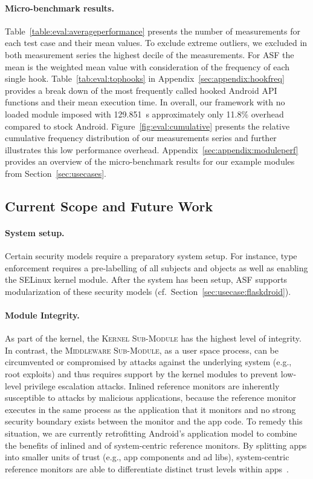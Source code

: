 \documentclass[letterpaper,twocolumn,10pt]{article}
\newcommand{\OURSHORT}{\textsc{ASF}\xspace}
\newcommand{\KMODULE}{\textsc{Kernel Sub-Module}\xspace}
\newcommand{\MMODULE}{\textsc{Middleware Sub-Module}\xspace}
\begin{document}
\paragraph{Micro-benchmark results.}
Table~\ref{table:eval:averageperformance} presents the number of measurements for each test case and their mean values. To exclude extreme outliers, we excluded in both measurement series the highest decile of the measurements. For \OURSHORT the mean is the weighted mean value with consideration of the frequency of each single hook. Table~\ref{tab:eval:tophooks} in Appendix~\ref{sec:appendix:hookfreq} provides a break down of the most frequently called hooked Android API functions and their mean execution time. In overall, our framework with no loaded module imposed with 129.851~s approximately only 11.8\% overhead compared to stock Android. Figure~\ref{fig:eval:cumulative} presents the relative cumulative frequency distribution of our measurements series and further illustrates this low performance overhead. Appendix~\ref{sec:appendix:moduleperf} provides an overview of the micro-benchmark results for our example modules from Section~\ref{sec:usecases}.


\subsection{Current Scope and Future Work}
\label{sec:eval:limitations}

\paragraph{System setup.}

Certain security models require a preparatory system setup. For instance, type enforcement requires a pre-labelling of all subjects and objects as well as enabling the SELinux kernel module. After the system has been setup, \OURSHORT supports modularization of these security models (cf.~Section~\ref{sec:usecase:flaskdroid}).

\paragraph{Module Integrity.}

As part of the kernel, the \KMODULE has the highest level of integrity. In contrast, the \MMODULE, as a user space process, can be circumvented or compromised by attacks against the underlying system (e.g., root exploits) and thus requires support by the kernel modules to prevent low-level privilege escalation attacks. Inlined reference monitors are inherently susceptible to attacks by malicious applications, because the reference monitor executes in the same process as the application that it monitors and no strong security boundary exists between the monitor and the app code. To remedy this situation, we are currently retrofitting Android's application model to combine the benefits of inlined and of system-centric reference monitors. By splitting apps into smaller units of trust (e.g., app components and ad libs), system-centric reference monitors are able to differentiate distinct trust levels within apps~\cite{Provos:2003:PPE:1251353.1251369,Wang:2014:compasec,Shekhar:2012:ASS:2362793.2362821,Pearce:2012:APS:2414456.2414498}.
\end{document}
